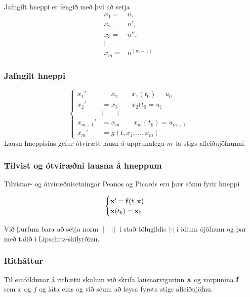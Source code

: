 \documentclass[icelandic,a4paper,12pt]{article}
\begin{document}
\pause
\smallskip
Jafngilt hneppi er fengið með því að setja 
\begin{align*}
x_1 =& u, \\
x_2 =& u', \\
x_3 =& u'', \\
\vdots& \\
x_m =& u^{(m-1)}
\end{align*}



\subsubsection{Jafngilt hneppi} 
\begin{equation*}
\begin{cases}
x_1' &= x_2 \qquad x_1(t_0) = u_0\\
x_2' &= x_3 \qquad x_2(t_0 = u_1\\
&\vdots \qquad \vdots\\
x_{m-1}' &= x_m \qquad x_m(t_0) = u_{m-1}\\
x_m' &= g(t,x_1, \ldots , x_m)
\end{cases}
\end{equation*}
Lausn hneppisins gefur ótvírætt lausn á upprunalegu $m$-ta stigs 
afleiðujöfnunni.



\subsubsection{Tilvist og ótvíræðni lausna á hneppum} 
Tilvistar- og ótvíræðnisetningar Peanos og  Picards 
eru þær sömu fyrir hneppi

\begin{equation*}
\begin{cases}
\mbox{${\bf x}$}' =\mbox{${\bf f}$}(t,\mbox{${\bf x}$})\\
\mbox{${\bf x}$}(t_0) = \mbox{${\bf x}$}_0
\end{cases}
\end{equation*}

\pause
\smallskip
Við þurfum bara að 
setja norm $\|\cdot\|$ í stað tölugildis $|\cdot|$ í öllum ójöfnum og
þar með talið í Lipschitz-skilyrðinu.



\subsubsection{Ritháttur} 
Til einföldunar á rithætti skulum við skrifa lausnarvigurinn $\mbox{${\bf x}$}$ 
og vörpunina $\mbox{${\bf f}$}$ sem $x$ og $f$ og láta eins og við séum að leysa 
fyrsta stigs afleiðujöfnu.
\end{document}
